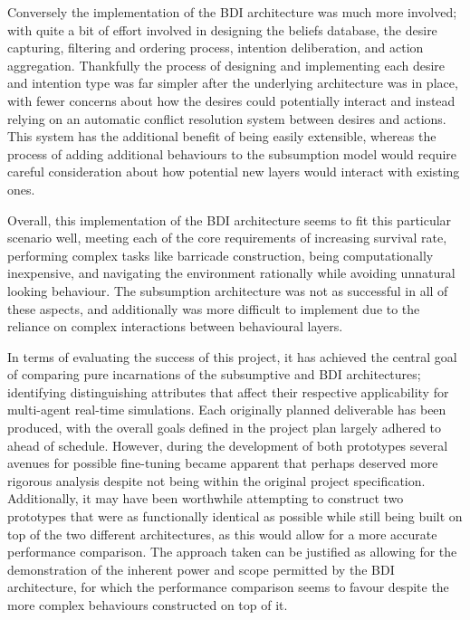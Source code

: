 \documentclass[a4paper,12pt]{article}
\begin{document}
Conversely the implementation of the BDI architecture was much more involved; with quite a bit of effort involved in designing the beliefs database, the desire capturing, filtering and ordering process, intention deliberation, and action aggregation. Thankfully the process of designing and implementing each desire and intention type was far simpler after the underlying architecture was in place, with fewer concerns about how the desires could potentially interact and instead relying on an automatic conflict resolution system between desires and actions. This system has the additional benefit of being easily extensible, whereas the process of adding additional behaviours to the subsumption model would require careful consideration about how potential new layers would interact with existing ones.

Overall, this implementation of the BDI architecture seems to fit this particular scenario well, meeting each of the core requirements of increasing survival rate, performing complex tasks like barricade construction, being computationally inexpensive, and navigating the environment rationally while avoiding unnatural looking behaviour. The subsumption architecture was not as successful in all of these aspects, and additionally was more difficult to implement due to the reliance on complex interactions between behavioural layers.

In terms of evaluating the success of this project, it has achieved the central goal of comparing pure incarnations of the subsumptive and BDI architectures; identifying distinguishing attributes that affect their respective applicability for multi-agent real-time simulations. Each originally planned deliverable has been produced, with the overall goals defined in the project plan largely adhered to ahead of schedule. However, during the development of both prototypes several avenues for possible fine-tuning became apparent that perhaps deserved more rigorous analysis despite not being within the original project specification. Additionally, it may have been worthwhile attempting to construct two prototypes that were as functionally identical as possible while still being built on top of the two different architectures, as this would allow for a more accurate performance comparison. The approach taken can be justified as allowing for the demonstration of the inherent power and scope permitted by the BDI architecture, for which the performance comparison seems to favour despite the more complex behaviours constructed on top of it.
\end{document}
